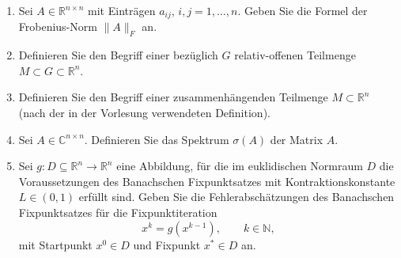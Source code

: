 \begin{enumerate}
\item Sei $A\in\mathbb{R}^{n\times n}$ mit Eintr\"agen $a_{ij}$, $i,j=1,\dots,n$. Geben Sie die Formel der Frobenius-Norm $\|A\|_F$ an.
\\

\item Definieren Sie den Begriff einer bez\"uglich $G$ relativ-offenen Teilmenge $M\subset G\subset\mathbb{R}^n$.
\\

\item Definieren Sie den Begriff einer zusammenhängenden Teilmenge $M\subset\mathbb{R}^n$ (nach der in der Vorlesung verwendeten Definition).
\\

\item Sei $A\in\mathbb{C}^{n\times n}$. Definieren Sie das Spektrum $\sigma(A)$ der Matrix $A$.
\\

\item Sei $g:D\subseteq\mathbb{R}^n\to\mathbb{R}^n$ eine Abbildung, f\"ur die im euklidischen Normraum $D$ die Voraussetzungen des Banachschen Fixpunktsatzes mit Kontraktionskonstante $L\in(0,1)$ erf\"ullt sind. Geben Sie die Fehlerabsch\"atzungen des Banachschen Fixpunktsatzes f\"ur die Fixpunktiteration
\[
x^{k}=g(x^{k-1}),\qquad k\in\mathbb{N},
\]
mit Startpunkt $x^0\in D$ und Fixpunkt $x^\ast\in D$ an.
\\


\end{enumerate}
